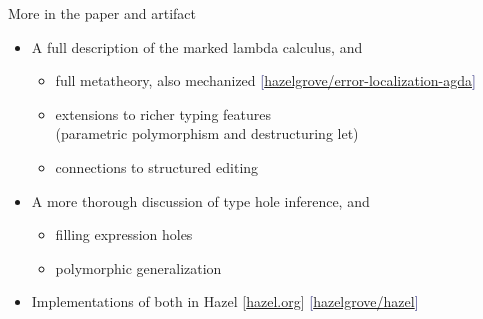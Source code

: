 \begin{frame}[fragile]{More in the paper and artifact}
  
  \vspace{-1em}
  \begin{itemize}
    \item A full description of the marked lambda calculus\pause, and

      \begin{itemize}
        \item full metatheory\pause, also mechanized
          \textcolor{MidnightBlue}{[\href{https://github.com/hazelgrove/error-localization-agda}{hazelgrove/error-localization-agda}]}

          \pause
        \item extensions to richer typing features \\ \pause
          (parametric polymorphism and destructuring let)

          \pause
        \item connections to structured editing
      \end{itemize}

      \pause
    \item A more thorough discussion of type hole inference\pause, and

      \begin{itemize}
        \item filling expression holes

          \pause
        \item polymorphic generalization
      \end{itemize}

      \pause
    \item Implementations of both in Hazel
      \textcolor{BrickRed}{\small[\href{https://hazel.org}{hazel.org}]}
      \textcolor{MidnightBlue}{\small[\href{https://github.com/hazelgrove/hazel}{hazelgrove/hazel}]}
  \end{itemize}


\end{frame}
